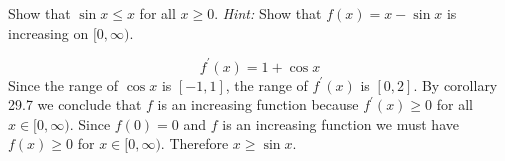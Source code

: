 
Show that $\sin x\le x$ for all $x\ge0$.
{\it Hint:} Show that $f(x)=x-\sin x$ is increasing on $[0,\infty).$

\medskip
$$f^\prime(x)=1+\cos x$$
Since the range of $\cos x$ is $[-1,1]$, the range of $f^\prime(x)$ is
$[0,2]$. By corollary 29.7 we conclude that $f$ is an increasing function
because $f^\prime(x)\ge0$ for all $x\in[0,\infty)$.
Since $f(0)=0$ and $f$ is an increasing function we must have
$f(x)\ge0$ for $x\in[0,\infty)$.
Therefore $x\ge\sin x$.